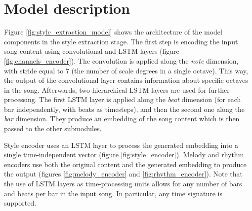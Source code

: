 \documentclass[en]{pracamgr}
\begin{document}
\section{Model description}

Figure \ref{fig:style_extraction_model} shows the architecture of the model components in the style extraction stage.
The first step is encoding the input song content using convolutional and LSTM layers (figure \ref{fig:channels_encoder}).
The convolution is applied along the \emph{note} dimension, with stride equal to 7 (the number of scale degrees in a single octave).
This way, the output of the convolutional layer contains information about specific octaves in the song.
Afterwards, two hierarchical LSTM layers are used for further processing.
The first LSTM layer is applied along the \emph{beat} dimension (for each bar independently, with beats as timesteps), and then the second one along the \emph{bar} dimension.
They produce an embedding of the song content which is then passed to the other submodules.

Style encoder uses an LSTM layer to process the generated embedding into a single time-independent vector (figure \ref{fig:style_encoder}).
Melody and rhythm encoders use both the original content and the generated embedding to produce the output (figures \ref{fig:melody_encoder} and \ref{fig:rhythm_encoder}).
Note that the use of LSTM layers as time-processing units allows for any number of bars and beats per bar in the input song. In particular, any time signature is supported.
\end{document}
